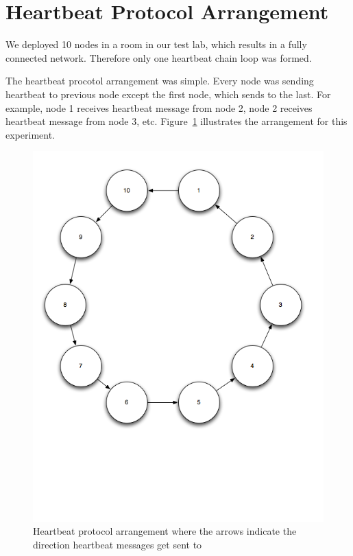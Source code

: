 \section{Heartbeat Protocol Arrangement}

We deployed 10 nodes in a room in our test lab, which results in a fully
connected network. Therefore only one heartbeat chain loop was formed.

The heartbeat procotol arrangement was simple. Every node was sending heartbeat to
previous node except the first node, which sends to the last. For example, node
1 receives heartbeat message from node 2, node 2 receives heartbeat message from
node 3, etc. Figure~\ref{fig:heartbeat-protocol-arrangement} illustrates the
arrangement for this experiment.

\begin{figure}[h!]
\centering
    \includegraphics[width=\linewidth]{figures/heartbeat-protocol-arrangement}
\caption{Heartbeat protocol arrangement where the arrows indicate the direction
  heartbeat messages get sent to}
\label{fig:heartbeat-protocol-arrangement}
\end{figure}

